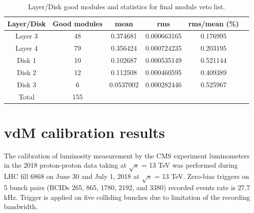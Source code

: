 \begin{table}[!htp]
  \centering
  \caption[Final module veto statistics]{Layer/Disk good modules and statistics for final module veto list.}
\begin{tabular}{cccccc}
\textbf{Layer/Disk} & \textbf{Good modules} & \textbf{mean} & \textbf{rms} & \textbf{rms/mean} (\%) \\
\hline
Layer 3 & 48 & 0.374681 & 0.000663165 & 0.176995 \\
Layer 4 & 79 & 0.356424 & 0.000724235 & 0.203195 \\
Disk 1 & 10 & 0.102687 & 0.000535149 & 0.521144 \\
Disk 2 & 12 & 0.112508 & 0.000460595 & 0.409389 \\
Disk 3 & 6 & 0.0537002 & 0.000282446 & 0.525967 \\
Total  & 155 & & \\
\end{tabular}
\label{tab:layer-disk}
\end{table}

\section{vdM calibration results}

The calibration of luminosity measurement by the CMS experiment luminometers in the 2018 proton-proton data taking at $\sqrt{s}$ = 13 TeV \cite{CMS-PAS-LUM-18-002} was performed during LHC fill 6868 on June 30 and July 1, 2018 at $\sqrt{s}$ = 13 TeV. Zero-bias triggers on 5 bunch pairs (BCIDs 265, 865, 1780, 2192, and 3380) recorded events rate is 27.7 kHz. Trigger is applied on five colliding bunches due to limitation of the recording bandwidth.

